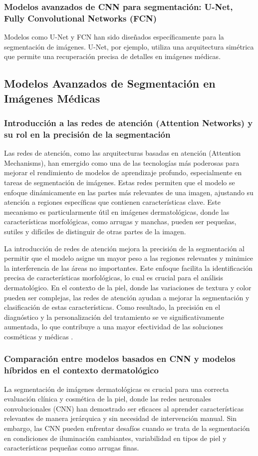 \subsubsection{Modelos avanzados de CNN para segmentación: U-Net, Fully Convolutional Networks (FCN)}
Modelos como U-Net y FCN han sido diseñados específicamente para la segmentación de imágenes. U-Net, por ejemplo, utiliza una arquitectura simétrica que permite una recuperación precisa de detalles en imágenes médicas. \parencite{ronneberger2015}


\subsection{Modelos Avanzados de Segmentación en Imágenes Médicas}
%
\subsubsection{Introducción a las redes de atención (Attention Networks) y su rol en la precisión de la segmentación}
Las redes de atención, como las arquitecturas basadas en atención (Attention Mechanisms), han emergido como una de las tecnologías más poderosas para mejorar el rendimiento de modelos de aprendizaje profundo, especialmente en tareas de segmentación de imágenes. Estas redes permiten que el modelo se enfoque dinámicamente en las partes más relevantes de una imagen, ajustando su atención a regiones específicas que contienen características clave. Este mecanismo es particularmente útil en imágenes dermatológicas, donde las características morfológicas, como arrugas y manchas, pueden ser pequeñas, sutiles y difíciles de distinguir de otras partes de la imagen.

La introducción de redes de atención mejora la precisión de la segmentación al permitir que el modelo asigne un mayor peso a las regiones relevantes y minimice la interferencia de las áreas no importantes. Este enfoque facilita la identificación precisa de características morfológicas, lo cual es crucial para el análisis dermatológico. En el contexto de la piel, donde las variaciones de textura y color pueden ser complejas, las redes de atención ayudan a mejorar la segmentación y clasificación de estas características. Como resultado, la precisión en el diagnóstico y la personalización del tratamiento se ve significativamente aumentada, lo que contribuye a una mayor efectividad de las soluciones cosméticas y médicas \parencite{wang2018}.
%
\subsubsection{Comparación entre modelos basados en CNN y modelos híbridos en el contexto dermatológico}
La segmentación de imágenes dermatológicas es crucial para una correcta evaluación clínica y cosmética de la piel, donde las redes neuronales convolucionales (CNN) han demostrado ser eficaces al aprender características relevantes de manera jerárquica y sin necesidad de intervención manual. Sin embargo, las CNN pueden enfrentar desafíos cuando se trata de la segmentación en condiciones de iluminación cambiantes, variabilidad en tipos de piel y características pequeñas como arrugas finas.

